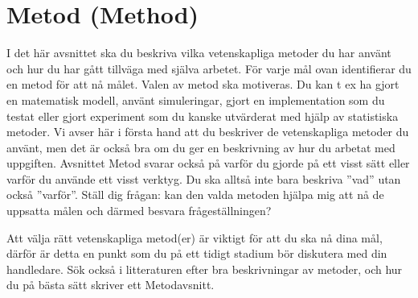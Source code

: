 \section{Metod (Method)} 
\label{sec:method}

I det här avsnittet ska du beskriva vilka vetenskapliga metoder du har använt och hur du har gått tillväga med själva arbetet. För varje mål ovan identifierar du en metod för att nå målet. Valen av metod ska motiveras. Du kan t ex ha gjort en matematisk modell, använt simuleringar, gjort en implementation som du testat eller gjort experiment som du kanske utvärderat med hjälp av statistiska metoder. Vi avser här i första hand att du beskriver de vetenskapliga metoder du använt, men det är också bra om du ger en beskrivning av hur du arbetat med uppgiften. Avsnittet Metod svarar också på varför du gjorde på ett visst sätt eller varför du använde ett visst verktyg. Du ska alltså inte bara beskriva ”vad” utan  också ”varför”. Ställ dig frågan: kan den valda metoden hjälpa mig att nå de uppsatta målen och därmed besvara frågeställningen?

Att välja rätt vetenskapliga metod(er) är viktigt för att du ska nå dina mål, därför är detta en punkt som du på ett tidigt stadium bör diskutera med din handledare. Sök också i litteraturen efter bra beskrivningar av metoder, och hur du på bästa sätt skriver ett Metodavsnitt. 
